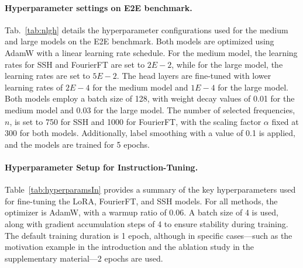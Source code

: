 \paragraph{Hyperparameter settings on E2E benchmark.} Tab.~\ref{tab:nlgh} details the hyperparameter configurations used for the medium and large models on the E2E benchmark. Both models are optimized using AdamW with a linear learning rate schedule. For the medium model, the learning rates for SSH and FourierFT are set to \(2E-2\), while for the large model, the learning rates are set to \(5E-2\). The head layers are fine-tuned with lower learning rates of \(2E-4\) for the medium model and \(1E-4\) for the large model. Both models employ a batch size of 128, with weight decay values of 0.01 for the medium model and 0.03 for the large model. The number of selected frequencies, \(n\), is set to 750 for SSH and 1000 for FourierFT, with the scaling factor \(\alpha\) fixed at 300 for both models. Additionally, label smoothing with a value of 0.1 is applied, and the models are trained for 5 epochs.



\begin{table}
\centering
{}
\caption{\small Hyperparameter settings for instruction-tuning configurations.}
\label{tab:hyperparamsIn}
\end{table}


\paragraph{Hyperparameter Setup for Instruction-Tuning.} Table~\ref{tab:hyperparamsIn} provides a summary of the key hyperparameters used for fine-tuning the LoRA, FourierFT, and SSH models. For all methods, the optimizer is AdamW, with a warmup ratio of 0.06. A batch size of 4 is used, along with gradient accumulation steps of 4 to ensure stability during training. The default training duration is 1 epoch, although in specific cases—such as the motivation example in the introduction and the ablation study in the supplementary material—2 epochs are used.

